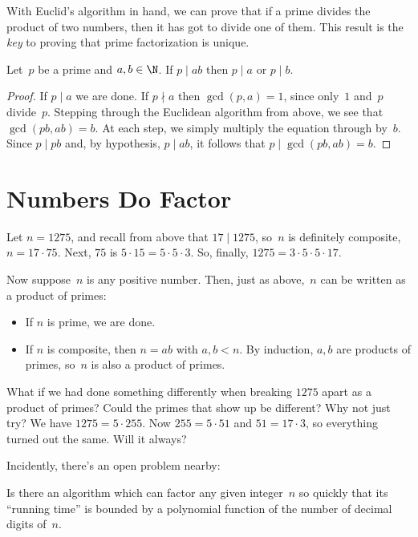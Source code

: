 \documentclass[11pt]{report}
\begin{document}
With Euclid's algorithm in hand, we can prove that if a prime divides the
product of two numbers, then it has got to divide one of them.  This
result is the {\em key} to proving that prime factorization
is unique.

\begin{theorem}[Euclid]\label{thm:euclid}
  Let~$p$ be a prime and $a, b\in \N$.
  If $p\mid ab$ then $p\mid a$ or $p\mid b$.
\end{theorem}
\begin{proof}
  If $p\mid a$ we are done.  If $p\nmid a$ then $\gcd(p,a)=1$, since
  only~$1$ and~$p$ divide~$p$.  Stepping through the Euclidean algorithm
  from above, we see that $\gcd(pb,ab) = b.$  At each step, we simply
  multiply the equation through by~$b$.  Since $p\mid pb$ and,
  by hypothesis, $p\mid ab$, it follows that $p\mid \gcd(pb,ab) = b$.
\end{proof}






\section{Numbers Do Factor}
Let $n=1275$, and recall from above that $17\mid 1275$, so~$n$
is definitely composite, $n=17 \cdot 75$.  Next, $75$ is $5\cdot 15=5\cdot 5\cdot 3$.
So, finally, $1275 = 3\cdot 5\cdot 5\cdot 17$.

Now suppose~$n$ is any positive number.
Then, just as above,~$n$ can be written as a product of primes:
\begin{itemize}
  \item If $n$ is prime, we are done.
  \item If $n$ is composite, then $n=ab$ with $a,b<n$. By induction,
        $a,b$ are products of primes, so~$n$ is also a product of primes.
\end{itemize}

What if we had done something differently when breaking $1275$ apart
as a product of primes?  Could the primes that show up be different?
Why not just try?  We have $1275 = 5\cdot 255$.  Now $255=5\cdot 51$ and
$51=17\cdot 3$, so everything turned out the same.  Will it always?

Incidently, there's an open problem nearby:

 Is there an algorithm which can factor any
given integer~$n$ so quickly that its ``running time'' is bounded by
a polynomial function of the number of decimal digits of~$n$.
\vspace{1ex}
\end{document}
